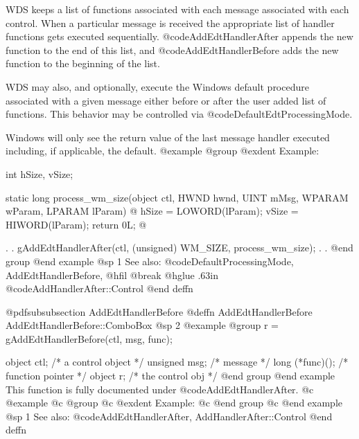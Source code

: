 WDS keeps a list of functions associated with each message associated
with each control.  When a particular message is received the appropriate
list of handler functions gets executed sequentially.
@code{AddEdtHandlerAfter} appends the new function to the end of this list,
and @code{AddEdtHandlerBefore} adds the new function to the beginning of
the list.

WDS may also, and optionally, execute the Windows default procedure
associated with a given message either before or after the user added
list of functions.  This behavior may be controlled via
@code{DefaultEdtProcessingMode}.

Windows will only see the return value of the last message handler executed
including, if applicable, the default.
@example
@group
@exdent Example:

int     hSize, vSize;

static  long    process_wm_size(object  ctl, 
                                HWND    hwnd, 
                                UINT    mMsg, 
                                WPARAM  wParam, 
                                LPARAM  lParam)
@{
        hSize = LOWORD(lParam);
        vSize = HIWORD(lParam);
        return 0L;
@}

        .
        .
        gAddEdtHandlerAfter(ctl, (unsigned) WM_SIZE,
                                       process_wm_size);
        .
        .
@end group
@end example
@sp 1
See also:  @code{DefaultProcessingMode, AddEdtHandlerBefore,}
@hfil @break @hglue .63in @code{AddHandlerAfter::Control}
@end deffn






@pdfsubsubsection {AddEdtHandlerBefore}
@deffn {AddEdtHandlerBefore} AddEdtHandlerBefore::ComboBox
@sp 2
@example
@group
r = gAddEdtHandlerBefore(ctl, msg, func);

object   ctl;      /*  a control object  */
unsigned msg;      /*  message           */
long    (*func)(); /*  function pointer  */
object  r;         /*  the control obj   */
@end group
@end example
This function is fully documented under @code{AddEdtHandlerAfter}.
@c @example
@c @group
@c @exdent Example:
@c @end group
@c @end example
@sp 1
See also:  @code{AddEdtHandlerAfter, AddHandlerAfter::Control}
@end deffn













